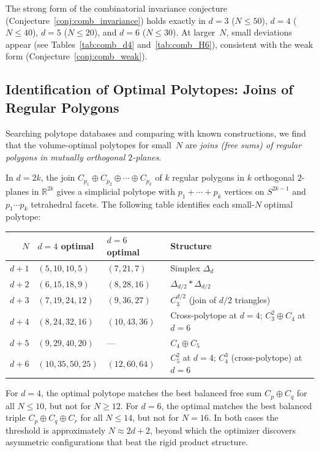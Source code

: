 \documentclass[11pt]{article}
\begin{document}
The strong form of the combinatorial invariance conjecture
(Conjecture~\ref{conj:comb_invariance}) holds exactly in
$d = 3$ ($N \leq 50$), $d = 4$ ($N \leq 40$), $d = 5$ ($N \leq 20$),
and $d = 6$ ($N \leq 30$).
At larger~$N$, small deviations appear (see Tables~\ref{tab:comb_d4}
and~\ref{tab:comb_H6}), consistent with the weak form
(Conjecture~\ref{conj:comb_weak}).

\subsection{Identification of Optimal Polytopes: Joins of Regular Polygons}
\label{sec:joins}

Searching polytope databases and comparing with known constructions,
we find that the volume-optimal polytopes for small~$N$ are
\emph{joins (free sums) of regular polygons in mutually orthogonal $2$-planes}.

In $d = 2k$, the join $C_{p_1} \oplus C_{p_2} \oplus \cdots \oplus C_{p_k}$
of $k$ regular polygons in $k$ orthogonal $2$-planes in $\mathbb{R}^{2k}$
gives a simplicial polytope with $p_1 + \cdots + p_k$ vertices on
$S^{2k-1}$ and $p_1 \cdots p_k$ tetrahedral facets. The following table
identifies each small-$N$ optimal polytope:

\begin{center}
\begin{tabular}{r l l l}
\toprule
$N$ & $d=4$ optimal & $d=6$ optimal & Structure \\
\midrule
$d+1$ & $(5,10,10,5)$ & $(7,21,7)$ & Simplex $\Delta_d$ \\
$d+2$ & $(6,15,18,9)$ & $(8,28,16)$ & $\Delta_{d/2} * \Delta_{d/2}$ \\
$d+3$ & $(7,19,24,12)$ & $(9,36,27)$ & $C_3^{d/2}$ (join of $d/2$ triangles) \\
$d+4$ & $(8,24,32,16)$ & $(10,43,36)$ & Cross-polytope at $d{=}4$; $C_3^2{\oplus}C_4$ at $d{=}6$\\
$d+5$ & $(9,29,40,20)$ & --- & $C_4{\oplus}C_5$ \\
$d+6$ & $(10,35,50,25)$ & $(12,60,64)$ & $C_5^2$ at $d{=}4$; $C_4^3$ (cross-polytope) at $d{=}6$ \\
\bottomrule
\end{tabular}
\end{center}

For $d = 4$, the optimal polytope matches the best balanced
free sum $C_p \oplus C_q$ for all $N \leq 10$, but not for $N \geq 12$.
For $d = 6$, the optimal matches the best balanced triple
$C_p \oplus C_q \oplus C_r$ for all $N \leq 14$, but not for $N = 16$.
In both cases the threshold is approximately $N \approx 2d + 2$, beyond
which the optimizer discovers asymmetric configurations that beat
the rigid product structure.
\end{document}

